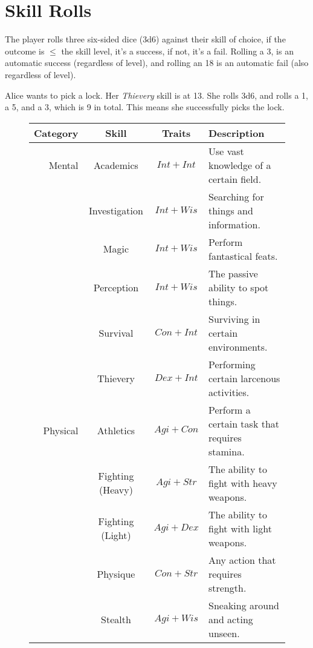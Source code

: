 \section{Skill Rolls}
The player rolls three six-sided dice (3d6) against their skill of choice, if the outcome is $\leq$ the skill level, it's a success, if not, it's a fail.
Rolling a 3, is an automatic success (regardless of level), and rolling an 18 is an automatic fail (also regardless of level).

\begin{example} 
    Alice wants to pick a lock. 
    Her \textit{Thievery} skill is at 13. 
    She rolls 3d6, and rolls a 1, a 5, and a 3, which is 9 in total. 
    This means she successfully picks the lock.
\end{example}

\begin{figure}
\centering
\begin{tabular}{r | c | c | l}
\textbf{Category} & \textbf{Skill}   & \textbf{Traits} & \textbf{Description} \\\hline
    Mental    & Academics        & $Int+Int$ & Use vast knowledge of a certain field.        \\
              & Investigation    & $Int+Wis$ & Searching for things and information.         \\
              & Magic            & $Int+Wis$ & Perform fantastical feats.                    \\
              & Perception       & $Int+Wis$ & The passive ability to spot things.           \\
              & Survival         & $Con+Int$ & Surviving in certain environments.            \\
              & Thievery         & $Dex+Int$ & Performing certain larcenous activities.      \\\hline
    Physical  & Athletics        & $Agi+Con$ & Perform a certain task that requires stamina. \\
              & Fighting (Heavy) & $Agi+Str$ & The ability to fight with heavy weapons.      \\
              & Fighting (Light) & $Agi+Dex$ & The ability to fight with light weapons.      \\
              & Physique         & $Con+Str$ & Any action that requires strength.            \\
              & Stealth          & $Agi+Wis$ & Sneaking around and acting unseen.            \\\hline

\end{tabular}
\end{figure}
